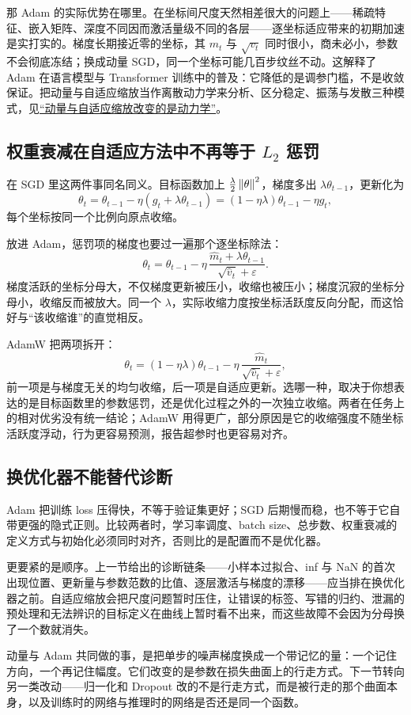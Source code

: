 那 Adam 的实际优势在哪里。在坐标间尺度天然相差很大的问题上——稀疏特征、嵌入矩阵、深度不同因而激活量级不同的各层——逐坐标适应带来的初期加速是实打实的。梯度长期接近零的坐标，其 \(m_t\) 与 \(\sqrt{v_t}\) 同时很小，商未必小，参数不会彻底冻结；换成动量 SGD，同一个坐标可能几百步纹丝不动。这解释了 Adam 在语言模型与 Transformer 训练中的普及：它降低的是调参门槛，不是收敛保证。把动量与自适应缩放当作离散动力学来分析、区分稳定、振荡与发散三种模式，见\hyperref[sec:09-Convex-Optimization/08-Nonconvex-and-Stochastic-Optimization/05]{``动量与自适应缩放改变的是动力学''}。

\subsection{权重衰减在自适应方法中不再等于 \(L_2\) 惩罚}

在 SGD 里这两件事同名同义。目标函数加上 \(\frac{\lambda}{2}\left\lVert\theta\right\rVert^2\)，梯度多出 \(\lambda\theta_{t-1}\)，更新化为
\[
\theta_t=\theta_{t-1}-\eta(g_t+\lambda\theta_{t-1})=(1-\eta\lambda)\theta_{t-1}-\eta g_t,
\]
每个坐标按同一个比例向原点收缩。

放进 Adam，惩罚项的梯度也要过一遍那个逐坐标除法：
\[
\theta_t=\theta_{t-1}-\eta\,\frac{\widehat m_t+\lambda\theta_{t-1}}{\sqrt{\widehat v_t}+\varepsilon}.
\]
梯度活跃的坐标分母大，不仅梯度更新被压小，收缩也被压小；梯度沉寂的坐标分母小，收缩反而被放大。同一个 \(\lambda\)，实际收缩力度按坐标活跃度反向分配，而这恰好与``该收缩谁''的直觉相反。

AdamW 把两项拆开：
\[
\theta_t=(1-\eta\lambda)\theta_{t-1}-\eta\,\frac{\widehat m_t}{\sqrt{\widehat v_t}+\varepsilon},
\]
前一项是与梯度无关的均匀收缩，后一项是自适应更新。选哪一种，取决于你想表达的是目标函数里的参数惩罚，还是优化过程之外的一次独立收缩。两者在任务上的相对优劣没有统一结论；AdamW 用得更广，部分原因是它的收缩强度不随坐标活跃度浮动，行为更容易预测，报告超参时也更容易对齐。

\subsection{换优化器不能替代诊断}

Adam 把训练 loss 压得快，不等于验证集更好；SGD 后期慢而稳，也不等于它自带更强的隐式正则。比较两者时，学习率调度、batch size、总步数、权重衰减的定义方式与初始化必须同时对齐，否则比的是配置而不是优化器。

更要紧的是顺序。上一节给出的诊断链条——小样本过拟合、inf 与 NaN 的首次出现位置、更新量与参数范数的比值、逐层激活与梯度的漂移——应当排在换优化器之前。自适应缩放会把尺度问题暂时压住，让错误的标签、写错的归约、泄漏的预处理和无法辨识的目标定义在曲线上暂时看不出来，而这些故障不会因为分母换了一个数就消失。

动量与 Adam 共同做的事，是把单步的噪声梯度换成一个带记忆的量：一个记住方向，一个再记住幅度。它们改变的是参数在损失曲面上的行走方式。下一节转向另一类改动——归一化和 Dropout 改的不是行走方式，而是被行走的那个曲面本身，以及训练时的网络与推理时的网络是否还是同一个函数。
